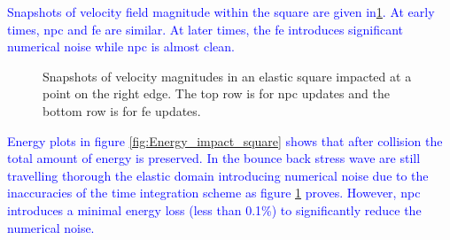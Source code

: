 \documentclass[preprint,12pt,a4paper]{elsarticle}
\newcommand{\MODIFIED}[1]{
  \textcolor{blue}{{#1}}
}
\begin{document}
\MODIFIED{Snapshots of velocity field magnitude within the square are given in\ref{fig:Magnitude_velocity_impact_square}. At early times, \acrshort{npc} and \acrshort{fe} are similar. At later times, the \acrshort{fe} introduces significant numerical noise while \acrshort{npc} is almost clean. }
\begin{figure}
  \centering
  \caption{Snapshots of velocity magnitudes in an elastic square impacted at a point on the right edge. The top row is for \acrshort{npc} updates and the bottom row is for \acrshort{fe} updates.}
  \label{fig:Magnitude_velocity_impact_square}
\end{figure}
\MODIFIED{Energy plots in figure \ref{fig:Energy_impact_square} shows that after collision the total amount of energy is preserved. In the bounce back stress wave are still travelling thorough the elastic domain introducing numerical noise due to the inaccuracies of the time integration scheme as figure \ref{fig:Magnitude_velocity_impact_square} proves. However, \acrshort{npc} introduces a minimal energy loss (less than 0.1\%) to significantly reduce the numerical noise. }
\end{document}
